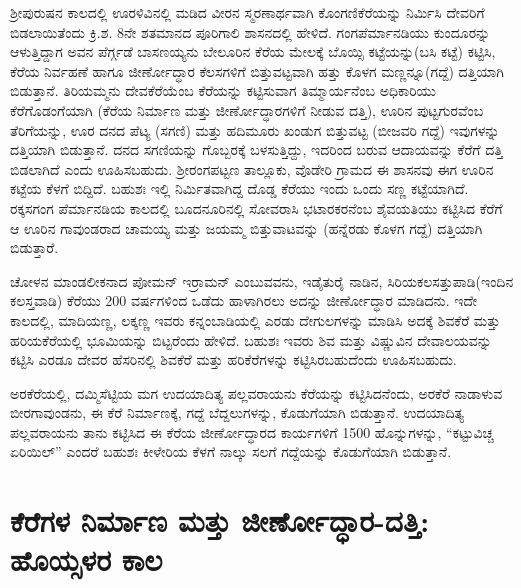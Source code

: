 ಶ‍್ರೀಪುರುಷನ ಕಾಲದಲ್ಲಿ ಊರಳಿವಿನಲ್ಲಿ ಮಡಿದ ವೀರನ ಸ್ಮರಣಾರ್ಥವಾಗಿ ಕೊಂಗಣಿಕೆರೆಯನ್ನು ನಿರ್ಮಿಸಿ ದೇವರಿಗೆ ಬಿಡಲಾಯಿತೆಂದು ಕ್ರಿ.ಶ. 8ನೇ ಶತಮಾನದ ಪೂರಿಗಾಲಿ ಶಾಸನದಲ್ಲಿ ಹೇಳಿದೆ. ಗಂಗಪೆರ್ಮಾನಡಿಯು ಕುಂದೂರನ್ನು ಆಳುತ್ತಿದ್ದಾಗ ಅವನ ಪೆರ್ಗ್ಗಡೆ ಬಾಸಣಯ್ಯನು ಬೇಲೂರಿನ ಕೆರೆಯ ಮೇಲಕ್ಕೆ ಬೊಯ್ಸಿ ಕಟ್ಟೆಯನ್ನು(ಬಸಿ ಕಟ್ಟೆ) ಕಟ್ಟಿಸಿ, ಕೆರೆಯ ನಿರ್ವಹಣೆ ಹಾಗೂ ಜೀರ್ಣೋದ್ಧಾರ ಕೆಲಸಗಳಿಗೆ ಬಿತ್ತುವಟ್ಟವಾಗಿ ಹತ್ತು ಕೊಳಗ ಮಣ್ಣನ್ನೂ(ಗದ್ದೆ) ದತ್ತಿಯಾಗಿ ಬಿಡುತ್ತಾನೆ. ತಿರಿಯಮ್ಮನು ದೇವಕೆರೆಯೆಂಬ ಕೆರೆಯನ್ನು ಕಟ್ಟಿಸುವಾಗ ತಿಮ್ಮಾರ್ಯನೆಂಬ ಅಧಿಕಾರಿಯು ಕೆರೆಗೊಡಂಗೆಯಾಗಿ (ಕೆರೆಯ ನಿರ್ಮಾಣ ಮತ್ತು ಜೀರ್ಣೋದ್ಧಾರಗಳಿಗೆ ನೀಡುವ ದತ್ತಿ), ಊರಿನ ಪುಟ್ಟಗುರವೆಂಬ ತೆರಿಗೆಯನ್ನು, ಊರ ದನದ ಪೆಟ್ಯ (ಸಗಣಿ) ಮತ್ತು ಹದಿಮೂರು ಖಂಡುಗ ಬಿತ್ತುವಟ್ಟ (ಬೀಜವರಿ ಗದ್ದೆ) ಇವುಗಳನ್ನು ದತ್ತಿಯಾಗಿ ಬಿಡುತ್ತಾನೆ. ದನದ ಸಗಣಿಯನ್ನು ಗೊಬ್ಬರಕ್ಕೆ ಬಳಸುತ್ತಿದ್ದು, ಇದರಿಂದ ಬರುವ ಆದಾಯವನ್ನು ಕೆರೆಗೆ ದತ್ತಿ ಬಿಡಲಾಗಿದೆ ಎಂದು ಊಹಿಸಬಹುದು. ಶ‍್ರೀರಂಗಪಟ್ಟಣ ತಾಲ್ಲೂಕು, ವೊಡೇರಿ ಗ್ರಾಮದ ಈ ಶಾಸನವು ಈಗ ಊರಿನ ಕಟ್ಟೆಯ ಕೆಳಗೆ ಬಿದ್ದಿದೆ. ಬಹುಶಃ ಇಲ್ಲಿ ನಿರ್ಮಿತವಾಗಿದ್ದ ದೊಡ್ಡ ಕೆರೆಯು ಇಂದು ಒಂದು ಸಣ್ಣ ಕಟ್ಟೆಯಾಗಿದೆ. ರಕ್ಕಸಗಂಗ ಪೆರ್ಮಾನಡಿಯ ಕಾಲದಲ್ಲಿ ಬೂದನೂರಿನಲ್ಲಿ ಸೋವರಾಸಿ ಭಟಾರಕರನೆಂಬ ಶೈವಯತಿಯು ಕಟ್ಟಿಸಿದ ಕೆರೆಗೆ ಆ ಊರಿನ ಗಾವುಂಡರಾದ ಚಾಮಯ್ಯ ಮತ್ತು ಜಯಮ್ಮ ಬಿತ್ತುವಾಟವನ್ನು (ಹನ್ನೆರಡು ಕೊಳಗ ಗದ್ದೆ) ದತ್ತಿಯಾಗಿ ಬಿಡುತ್ತಾರೆ.

ಚೋಳನ ಮಾಂಡಲೀಕನಾದ ಪೋಮನ್​ ಇರ್ರಾಮನ್​ ಎಂಬುವವನು, ಇಡೈತುರೈ ನಾಡಿನ, ಸಿರಿಯಕಲಸತ್ತುಪಾಡಿ\break (ಇಂದಿನ ಕಲಸ್ತವಾಡಿ) ಕೆರೆಯು 200 ವರ್ಷಗಳಿಂದ ಒಡೆದು ಹಾಳಾಗಿರಲು ಅದನ್ನು ಜೀರ್ಣೋದ್ಧಾರ ಮಾಡಿದನು. ಇದೇ ಕಾಲದಲ್ಲಿ, ಮಾದಿಯಣ್ಣ, ಲಕ್ಕಣ್ಣ ಇವರು ಕನ್ನಂಬಾಡಿಯಲ್ಲಿ ಎರಡು ದೇಗುಲಗಳನ್ನು ಮಾಡಿಸಿ ಅದಕ್ಕೆ ಶಿವಕೆರೆ ಮತ್ತು ಹರಿಯಕೆರೆಯಲ್ಲಿ ಭೂಮಿಯನ್ನು ಬಿಟ್ಟರೆಂದು ಹೇಳಿದೆ. ಬಹುಶಃ ಇವರು ಶಿವ ಮತ್ತು ವಿಷ್ಣುವಿನ ದೇವಾಲಯವನ್ನು ಕಟ್ಟಿಸಿ ಎರಡೂ ದೇವರ ಹೆಸರಿನಲ್ಲಿ ಶಿವಕೆರೆ ಮತ್ತು ಹರಿಕೆರೆಗಳನ್ನು ಕಟ್ಟಿಸಿರಬಹುದೆಂದು ಊಹಿಸಬಹುದು.

ಅರಕೆರೆಯಲ್ಲಿ, ದಮ್ಮಿಸೆಟ್ಟಿಯ ಮಗ ಉದಯಾದಿತ್ಯ ಪಲ್ಲವರಾಯನು ಕೆರೆಯನ್ನು ಕಟ್ಟಿಸಿದನೆಂದು, ಅರಕೆರೆ ನಾಡಾಳುವ ಬೀರಗಾವುಂಡನು, ಈ ಕೆರೆ ನಿರ್ಮಾಣಕ್ಕೆ, ಗದ್ದೆ ಬೆದ್ದಲುಗಳನ್ನು, ಕೊಡುಗೆಯಾಗಿ ಬಿಡುತ್ತಾನೆ. ಉದಯಾದಿತ್ಯ ಪಲ್ಲವರಾಯನು ತಾನು ಕಟ್ಟಿಸಿದ ಈ ಕೆರೆಯ ಜೀರ್ಣೋದ್ಧಾರದ ಕಾರ್ಯಗಳಿಗೆ 1500 ಹೊನ್ನುಗಳನ್ನು, “ಕಟ್ಟುವಿಚ್ಚ ಏರಿಯಿಲ್​” ಎಂದರೆ ಬಹುಶಃ ಕೀಳೇರಿಯ ಕೆಳಗೆ ನಾಲ್ಕು ಸಲಗೆ ಗದ್ದೆಯನ್ನು ಕೊಡುಗೆಯಾಗಿ ಬಿಡುತ್ತಾನೆ.


\section{ಕೆರೆಗಳ ನಿರ್ಮಾಣ ಮತ್ತು ಜೀರ್ಣೋದ್ಧಾರ-ದತ್ತಿ: ಹೊಯ್ಸಳರ ಕಾಲ}

